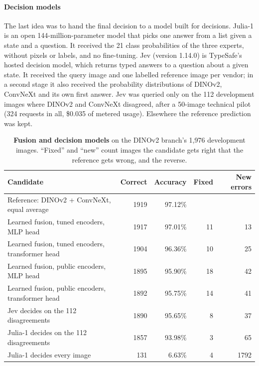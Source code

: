 \paragraph{Decision models} The last idea was to hand the final decision to a model built for decisions. Julia-1 \cite{julia2026} is an open 144-million-parameter model that picks one answer from a list given a state and a question. It received the 21 class probabilities of the three experts, without pixels or labels, and no fine-tuning. Jev (version 1.14.0) \cite{jev2026} is TypeSafe's hosted decision model, which returns typed answers to a question about a given state. It received the query image and one labelled reference image per vendor; in a second stage it also received the probability distributions of DINOv2, ConvNeXt and its own first answer. Jev was queried only on the 112 development images where DINOv2 and ConvNeXt disagreed, after a 50-image technical pilot (324 requests in all, \$0.035 of metered usage). Elsewhere the reference prediction was kept.

\begin{table}[t]
\centering\small
\caption{\textbf{Fusion and decision models} on the DINOv2 branch's 1{,}976 development images\rep. ``Fixed'' and ``new'' count images the candidate gets right that the reference gets wrong, and the reverse.}
\label{tab:fusion}
\begin{tabular}{@{}lrrrr@{}}
\toprule
Candidate & Correct & Accuracy & Fixed & New errors\\
\midrule
\rowcolor{panel}Reference: DINOv2 + ConvNeXt, equal average & \num{1919} & 97.12\% & & \\
Learned fusion, tuned encoders, MLP head & \num{1917} & 97.01\% & 11 & 13\\
Learned fusion, tuned encoders, transformer head & \num{1904} & 96.36\% & 10 & 25\\
Learned fusion, public encoders, MLP head & \num{1895} & 95.90\% & 18 & 42\\
Learned fusion, public encoders, transformer head & \num{1892} & 95.75\% & 14 & 41\\
Jev decides on the 112 disagreements & \num{1890} & 95.65\% & 8 & 37\\
Julia-1 decides on the 112 disagreements & \num{1857} & 93.98\% & 3 & 65\\
Julia-1 decides every image & 131 & 6.63\% & 4 & \num{1792}\\
\bottomrule
\end{tabular}
\end{table}

